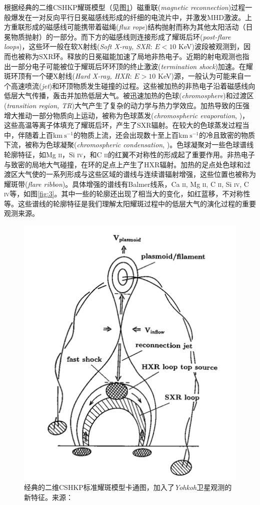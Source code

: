 根据经典的二维CSHKP耀斑模型\parencite{Carmichael1964,Sturrock1966,Hirayama1974,Kopp1976}（见图\ref{fig:2}）磁重联(\textit{magnetic reconnection})过程一般爆发在一对反向平行日冕磁感线形成的纤细的电流片中，并激发MHD激波\parencite{Shibata2011}。上方重联形成的磁感线可能携带着磁绳(\textit{flux rope})结构抛射而称为其他太阳活动（日冕物质抛射）的一部分。而下方的磁感线则连接形成了耀斑后环(\textit{post-flare loops})，这些环一般在软X射线(\textit{Soft X-ray, SXR}: $E<10$ KeV)波段被观测到，因而也被称为SXR环\parencite{Tsuneta1997,Zarro1999}。释放的日冕磁能加速了局地非热电子\parencite{Hudson2001,Tomczak2001,Krucker2007}。近期的射电观测也指出一部分电子可能被位于耀斑后环环顶的终止激波(\textit{termination shock})加速\parencite{Chen2015}。在耀斑环顶有一个硬X射线(\textit{Hard X-ray, HXR}: $E>10$ KeV)源\parencite{Masuda1994}，一般认为可能来自一个高速喷流(\textit{jet})和环顶物质发生碰撞的过程\parencite{Shibata2011}。这些被加热的非热电子沿着磁感线向低层大气传播，轰击并加热低层大气。被迅速加热的色球(\textit{chromosphere})和过渡区(\textit{transition region, TR})大气产生了复杂的动力学与热力学效应。加热导致的压强增大推动一部分物质向上运动，被称为色球蒸发(\textit{chromospheric evaporation}, \cite{Fisher1985a,Fisher1985b,Fisher1985c})，这些高温等离子体填充了耀斑后环，产生了SXR辐射。在较大的色球蒸发过程当中，伴随着上百km$\ \mathrm{s}^{-1}$的物质上流\parencite{Milligan2006b}，还会出现数十至上百km$\ \mathrm{s}^{-1}$的冷且致密的物质下流，被称为色球凝聚(\textit{chromospheric condensation}, \cite{Milligan2006a})。色球凝聚对一些色球谱线轮廓特征，如Mg \textsc{ii}，Si \textsc{iv}，和C \textsc{ii}的红翼不对称性的形成起了重要作用\parencites{Tian2015}。非热电子与致密的局地大气碰撞，在环的足点上产生了HXR辐射。加热的足点处色球和过渡区大气使的一系列形成与这些区域的谱线与连续谱辐射增强，这些位置也被称为耀斑带(\textit{flare ribbon})。具体增强的谱线有Balmer线系，Ca \textsc{ii}, Mg \textsc{ii}, C \textsc{ii}, Si \textsc{iv}, C \textsc{iv}等\parencite{Liu2015, Tian2015, Tian2018}，如图\ref{fig:3}。其中一些的轮廓还出现了相当大的变化，如红蓝移，不对称性等\parencite{Li2015, Tei2018}。这些谱线的轮廓特征是我们理解太阳耀斑过程中的低层大气的演化过程的重要观测来源。

\begin{figure}
	\centering
	\includegraphics[width=0.5\linewidth]{figs/fig2}
	\caption{经典的二维CSHKP标准耀斑模型卡通图，加入了\textit{Yohkoh}卫星观测的新特征。来源：\textcite{Shibata1995}}
	\label{fig:2}
\end{figure}

